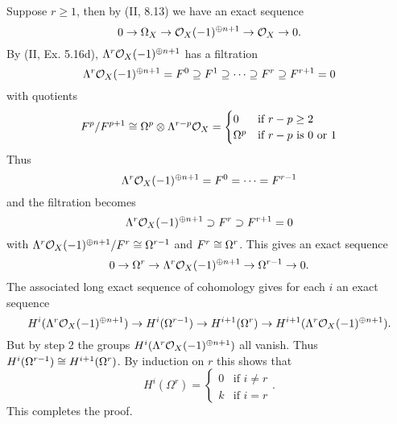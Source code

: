 \documentclass[12pt]{article}
\begin{document}
Suppose $r\geq 1$, then by (II, 8.13) we have an exact sequence
$$0\rightarrow\Omega_X\rightarrow\mathcal{O}_X(-1)^{\oplus n+1}\rightarrow\mathcal{O}_X\rightarrow 0.$$
By (II, Ex. 5.16d), $\Lambda^r\mathcal{O}_X(-1)^{\oplus n+1}$ has a filtration
$$\Lambda^r\mathcal{O}_X(-1)^{\oplus n+1}=F^0\supseteq F^1\supseteq\cdots\supseteq F^r\supseteq F^{r+1}=0$$
with quotients
$$F^p/F^{p+1}\cong\Omega^p\otimes\Lambda^{r-p}\mathcal{O}_X=
\begin{cases} 0&\text{if $r-p\geq 2$}\\
              \Omega^p&\text{if $r-p$ is $0$ or $1$}\end{cases}$$
Thus $$\Lambda^r\mathcal{O}_X(-1)^{\oplus n+1}=F^0=\cdots=F^{r-1}$$ and the filtration
becomes $$\Lambda^r\mathcal{O}_X(-1)^{\oplus n+1}\supset F^r\supset F^{r+1}=0$$ 
with $\Lambda^r\mathcal{O}_X(-1)^{\oplus n+1}/F^r\cong \Omega^{r-1}$ and 
$F^r\cong\Omega^r$. 
This gives an exact sequence
$$0\rightarrow\Omega^r\rightarrow\Lambda^r\mathcal{O}_X(-1)^{\oplus n+1}\rightarrow\Omega^{r-1}\rightarrow 0.$$
The associated long exact sequence of cohomology gives for each $i$ 
an exact sequence 
$$H^i(\Lambda^r\mathcal{O}_X(-1)^{\oplus n+1})\rightarrow H^i(\Omega^{r-1})
\rightarrow H^{i+1}(\Omega^r)\rightarrow H^{i+1}(\Lambda^r\mathcal{O}_X(-1)^{\oplus n+1}).$$
But by step 2 the groups $H^i(\Lambda^r\mathcal{O}_X(-1)^{\oplus n+1})$ all vanish.
Thus $H^i(\Omega^{r-1})\cong H^{i+1}(\Omega^r)$. By induction on 
$r$ this shows that 
$$H^i(\Omega^r)=\begin{cases}0&\text{if $i\neq r$}\\
                             k&\text{if $i=r$}\end{cases}.$$
This completes the proof. 
\end{document}
